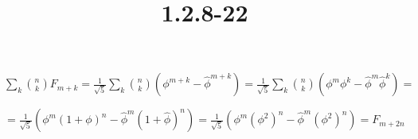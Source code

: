\documentclass{article}
\title{1.2.8-22}
\begin{document}
\maketitle

\( \sum_k \binom{n}{k}F_{m+k} = \frac{1}{\sqrt{5}}\sum_k \binom{n}{k}(\phi^{m+k} - \hat\phi^{m+k}) = \frac{1}{\sqrt{5}} \sum_{k}\binom{n}{k}(\phi^m\phi^{k} - \hat\phi^m\hat{\phi}^k) = \)

\( =\frac{1}{\sqrt{5}}(\phi^m(1+\phi)^n-\hat\phi^m(1+\hat\phi)^n) = \frac{1}{\sqrt{5}}(\phi^m(\phi^2)^n-\hat\phi^m(\phi^2)^n) = F_{m+2n} \)
\end{document}

